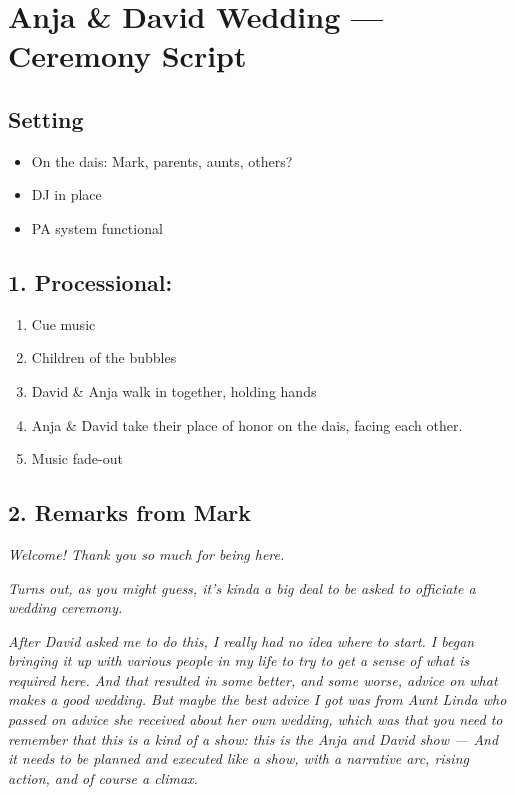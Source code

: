 \large
\hypertarget{section}{%
\section{Anja \& David Wedding --- Ceremony Script}\label{section}}


\hypertarget{setting}{%
\subsection{Setting}\label{setting}}

\begin{itemize}
\tightlist
\item
  On the dais: Mark, parents, aunts, others?
\item
  DJ in place
\item
  PA system functional
\end{itemize}

\hypertarget{processional}{%
\subsection{1. Processional:}\label{processional}}

\begin{enumerate}
\def\labelenumi{\arabic{enumi}.}
\tightlist
\item
  Cue music
\item
  Children of the bubbles
\item
  David \& Anja walk in together, holding hands
\item
  Anja \& David take their place of honor on the dais, facing each
  other.
\item
  Music fade-out
\end{enumerate}

\hypertarget{remarks-from-mark}{%
\subsection{2. Remarks from Mark}\label{remarks-from-mark}}

\emph{Welcome! Thank you so much for being here.}

\emph{Turns out, as you might guess, it's kinda a big deal to be asked
to officiate a wedding ceremony.}

\emph{After David asked me to do this, I really had no idea where to
start. I began bringing it up with various people in my life to try to
get a sense of what is required here. And that resulted in some better,
and some worse, advice on what makes a good wedding. But maybe the best
advice I got was from Aunt Linda who passed on advice she received about
her own wedding, which was that you need to remember that this is a kind
of a show: this is the Anja and David show --- And it needs to be
planned and executed like a show, with a narrative arc, rising action,
and of course a climax.}

